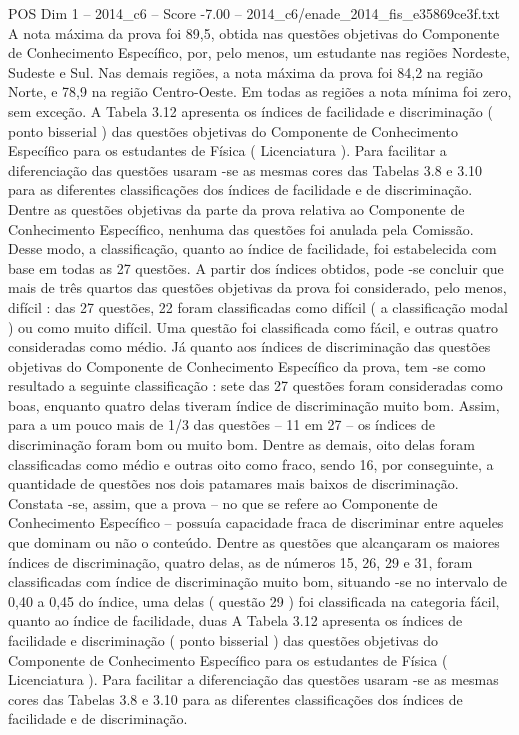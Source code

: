 \begin{textsample}{POS Dim 1 – 2014\_c6 – Score -7.00 – 2014\_c6/enade\_2014\_fis\_e35869ce3f.txt}
A nota máxima da prova foi 89,5, obtida nas questões objetivas do Componente de Conhecimento Específico, por, pelo menos, um estudante nas regiões Nordeste, Sudeste e Sul.
Nas demais regiões, a nota máxima da prova foi 84,2 na região Norte, e 78,9 na região Centro-Oeste.
Em todas as regiões a nota mínima foi zero, sem exceção.
A Tabela 3.12 apresenta os índices de facilidade e discriminação ( ponto bisserial ) das questões objetivas do Componente de Conhecimento Específico para os estudantes de Física ( Licenciatura ).
Para facilitar a diferenciação das questões usaram -se as mesmas cores das Tabelas 3.8 e 3.10 para as diferentes classificações dos índices de facilidade e de discriminação.
Dentre as questões objetivas da parte da prova relativa ao Componente de Conhecimento Específico, nenhuma das questões foi anulada pela Comissão.
Desse modo, a classificação, quanto ao índice de facilidade, foi estabelecida com base em todas as 27 questões.
A partir dos índices obtidos, pode -se concluir que mais de três quartos das questões objetivas da prova foi considerado, pelo menos, difícil : das 27 questões, 22 foram classificadas como difícil ( a classificação modal ) ou como muito difícil.
Uma questão foi classificada como fácil, e outras quatro consideradas como médio.
Já quanto aos índices de discriminação das questões objetivas do Componente de Conhecimento Específico da prova, tem -se como resultado a seguinte classificação : sete das 27 questões foram consideradas como boas, enquanto quatro delas tiveram índice de discriminação muito bom.
Assim, para a um pouco mais de 1/3 das questões – 11 em 27 – os índices de discriminação foram bom ou muito bom.
Dentre as demais, oito delas foram classificadas como médio e outras oito como fraco, sendo 16, por conseguinte, a quantidade de questões nos dois patamares mais baixos de discriminação.
Constata -se, assim, que a prova – no que se refere ao Componente de Conhecimento Específico – possuía capacidade fraca de discriminar entre aqueles que dominam ou não o conteúdo.
Dentre as questões que alcançaram os maiores índices de discriminação, quatro delas, as de números 15, 26, 29 e 31, foram classificadas com índice de discriminação muito bom, situando -se no intervalo de 0,40 a 0,45 do índice, uma delas ( questão 29 ) foi classificada na categoria fácil, quanto ao índice de facilidade, duas A Tabela 3.12 apresenta os índices de facilidade e discriminação ( ponto bisserial ) das questões objetivas do Componente de Conhecimento Específico para os estudantes de Física ( Licenciatura ).
Para facilitar a diferenciação das questões usaram -se as mesmas cores das Tabelas 3.8 e 3.10 para as diferentes classificações dos índices de facilidade e de discriminação.

\end{textsample}
